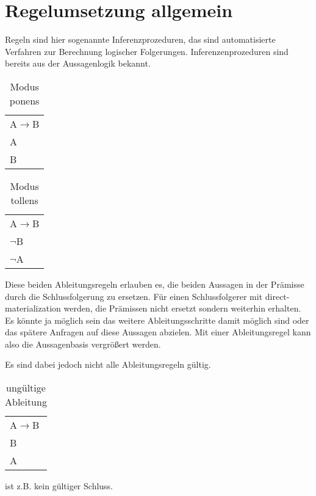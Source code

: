 \section{Regelumsetzung allgemein}
Regeln sind hier sogenannte Inferenzprozeduren, das sind automatisierte Verfahren zur Berechnung logischer Folgerungen. Inferenzenprozeduren sind bereits aus der Aussagenlogik bekannt.

\begin{table}[htb]
\begin{center}
	\begin{tabular}{l}
	A$\rightarrow$B \\
	A \\
	\hline
	B
	\end{tabular}
\end{center}
	\caption{Modus ponens}
	\label{table-modus-ponens}
\end{table}

\begin{table}[htb]
\begin{center}
	\begin{tabular}{l}
	A$\rightarrow$B \\
	$\neg$B \\
	\hline
	$\neg$A
	\end{tabular}
\end{center}
	\caption{Modus tollens}
	\label{table-modus-tollens}
\end{table}

Diese beiden Ableitungsregeln erlauben es, die beiden Aussagen in der Prämisse durch die Schlussfolgerung zu ersetzen. Für einen Schlussfolgerer mit direct-materialization werden, die Prämissen nicht ersetzt sondern weiterhin erhalten. Es könnte ja möglich sein das weitere Ableitungsschritte damit möglich sind oder das spätere Anfragen auf diese Aussagen abzielen. Mit einer Ableitungsregel kann also die Aussagenbasis vergrößert werden.

Es sind dabei jedoch nicht alle Ableitungsregeln gültig.
\begin{table}
\begin{center}
	\begin{tabular}{l}
	A$\rightarrow$B \\
	B \\
	\hline
	A
	\end{tabular}
\end{center}
	\caption{ungültige Ableitung}
	\label{table-invalid-inferred}
\end{table}
ist z.B. kein gültiger Schluss.

